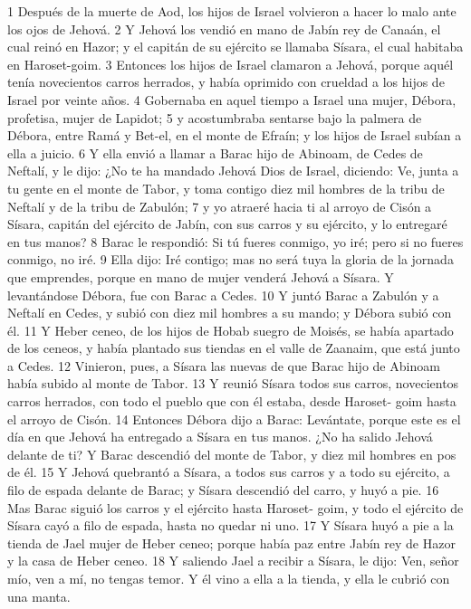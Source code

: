 1 Después de la muerte de Aod, los hijos de Israel volvieron a hacer lo malo ante los ojos de Jehová.
2 Y Jehová los vendió en mano de Jabín rey de Canaán, el cual reinó en Hazor; y el capitán de su ejército se llamaba Sísara, el cual habitaba en Haroset-goim.
3 Entonces los hijos de Israel clamaron a Jehová, porque aquél tenía novecientos carros herrados, y había oprimido con crueldad a los hijos de Israel por veinte años.
4 Gobernaba en aquel tiempo a Israel una mujer, Débora, profetisa, mujer de Lapidot;
5 y acostumbraba sentarse bajo la palmera de Débora, entre Ramá y Bet-el, en el monte de Efraín; y los hijos de Israel subían a ella a juicio.
6 Y ella envió a llamar a Barac hijo de Abinoam, de Cedes de Neftalí, y le dijo: ¿No te ha mandado Jehová Dios de Israel, diciendo: Ve, junta a tu gente en el monte de Tabor, y toma contigo diez mil hombres de la tribu de Neftalí y de la tribu de Zabulón;
7 y yo atraeré hacia ti al arroyo de Cisón a Sísara, capitán del ejército de Jabín, con sus carros y su ejército, y lo entregaré en tus manos?
8 Barac le respondió: Si tú fueres conmigo, yo iré; pero si no fueres conmigo, no iré.
9 Ella dijo: Iré contigo; mas no será tuya la gloria de la jornada que emprendes, porque en mano de mujer venderá Jehová a Sísara. Y levantándose Débora, fue con Barac a Cedes.
10 Y juntó Barac a Zabulón y a Neftalí en Cedes, y subió con diez mil hombres a su mando; y Débora subió con él.
11 Y Heber ceneo, de los hijos de Hobab suegro de Moisés, se había apartado de los ceneos, y había plantado sus tiendas en el valle de Zaanaim, que está junto a Cedes.
12 Vinieron, pues, a Sísara las nuevas de que Barac hijo de Abinoam había subido al monte de Tabor.
13 Y reunió Sísara todos sus carros, novecientos carros herrados, con todo el pueblo que con él estaba, desde Haroset- goim hasta el arroyo de Cisón.
14 Entonces Débora dijo a Barac: Levántate, porque este es el día en que Jehová ha entregado a Sísara en tus manos. ¿No ha salido Jehová delante de ti? Y Barac descendió del monte de Tabor, y diez mil hombres en pos de él.
15 Y Jehová quebrantó a Sísara, a todos sus carros y a todo su ejército, a filo de espada delante de Barac; y Sísara descendió del carro, y huyó a pie.
16 Mas Barac siguió los carros y el ejército hasta Haroset- goim, y todo el ejército de Sísara cayó a filo de espada, hasta no quedar ni uno.
17 Y Sísara huyó a pie a la tienda de Jael mujer de Heber ceneo; porque había paz entre Jabín rey de Hazor y la casa de Heber ceneo.
18 Y saliendo Jael a recibir a Sísara, le dijo: Ven, señor mío, ven a mí, no tengas temor. Y él vino a ella a la tienda, y ella le cubrió con una manta.

